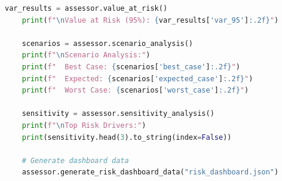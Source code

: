 \begin{lstlisting}[language=Python, caption=Quantitative Risk Scoring System]
    var_results = assessor.value_at_risk()
    print(f"\nValue at Risk (95%): {var_results['var_95']:.2f}")

    scenarios = assessor.scenario_analysis()
    print(f"\nScenario Analysis:")
    print(f"  Best Case: {scenarios['best_case']:.2f}")
    print(f"  Expected: {scenarios['expected_case']:.2f}")
    print(f"  Worst Case: {scenarios['worst_case']:.2f}")

    sensitivity = assessor.sensitivity_analysis()
    print(f"\nTop Risk Drivers:")
    print(sensitivity.head(3).to_string(index=False))

    # Generate dashboard data
    assessor.generate_risk_dashboard_data("risk_dashboard.json")
\end{lstlisting}

